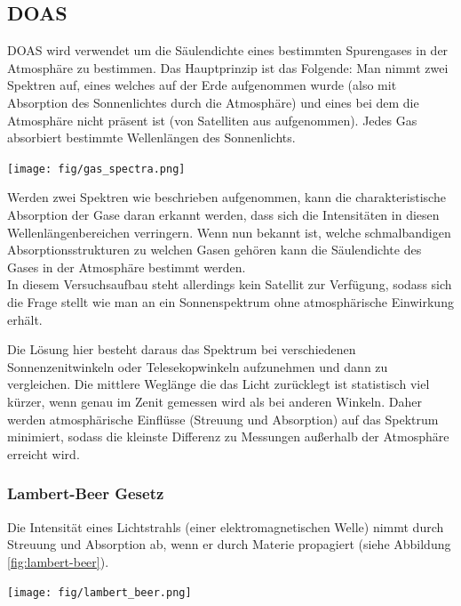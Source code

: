 \documentclass[12pt, a4paper, bibliography=totoc]{scrartcl}
\begin{document}
\begin{multicols}{2}
\subsection{DOAS}\label{ssec:DOAS}

DOAS wird verwendet um die Säulendichte eines bestimmten Spurengases in der Atmosphäre zu bestimmen.
Das Hauptprinzip ist das Folgende: 
    Man nimmt zwei Spektren auf, eines welches auf der Erde aufgenommen wurde (also mit Absorption des Sonnenlichtes durch die Atmosphäre) und eines bei dem die Atmosphäre nicht präsent ist (von Satelliten aus aufgenommen).
Jedes Gas absorbiert bestimmte Wellenlängen des Sonnenlichts.

\begin{center}
    \texttt{[image: fig/gas\_spectra.png]}
    \label{fig:gas_spectra}
\end{center}

Werden zwei Spektren wie beschrieben aufgenommen, kann die charakteristische Absorption der Gase daran erkannt werden, dass sich die Intensitäten in diesen Wellenlängenbereichen verringern.
Wenn nun bekannt ist, welche schmalbandigen Absorptionsstrukturen zu welchen Gasen gehören kann die Säulendichte des Gases in der Atmosphäre bestimmt werden.\\
In diesem Versuchsaufbau steht allerdings kein Satellit zur Verfügung, sodass sich die Frage stellt wie man an ein Sonnenspektrum ohne atmosphärische Einwirkung erhält.

Die Lösung hier besteht daraus das Spektrum bei verschiedenen Sonnenzenitwinkeln oder Telesekopwinkeln aufzunehmen und dann zu vergleichen.
Die mittlere Weglänge die das Licht zurücklegt ist statistisch viel kürzer, wenn genau im Zenit gemessen wird als bei anderen Winkeln.
Daher werden atmosphärische Einflüsse (Streuung und Absorption) auf das Spektrum minimiert, sodass die kleinste Differenz zu Messungen außerhalb der Atmosphäre erreicht wird. 

\subsubsection{Lambert-Beer Gesetz}\label{sssec:Lamb-Beer_law}

Die Intensität eines Lichtstrahls (einer elektromagnetischen Welle) nimmt durch Streuung und Absorption ab, wenn er durch Materie propagiert (siehe Abbildung \ref{fig:lambert-beer}).

\begin{center}
    \texttt{[image: fig/lambert\_beer.png]}
	\label{fig:lambert-beer}
\end{center}


\end{multicols}
\end{document}
